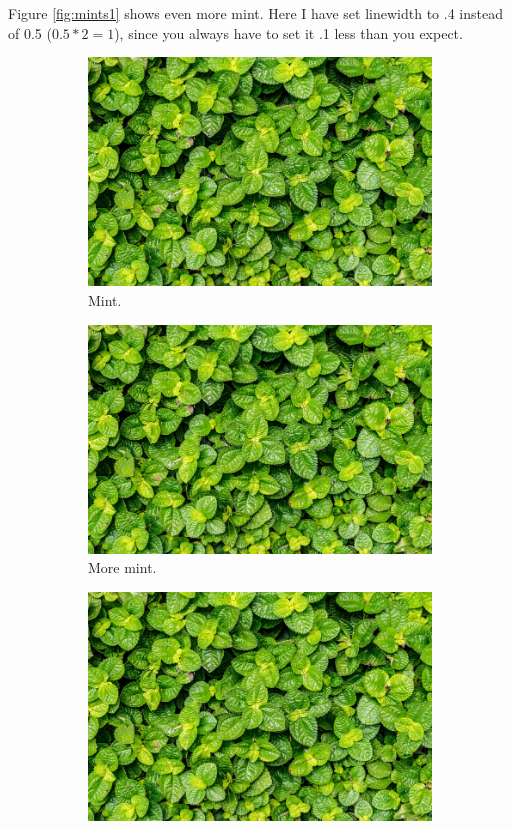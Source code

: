 \documentclass{book}
\begin{document}
Figure \ref{fig:mints1} shows even more mint. Here I have set linewidth to .4 instead of 0.5 ($0.5 * 2 = 1$), since you always have to set it .1 less than you expect.

\begin{figure}[h!]
  \centering
  \begin{subfigure}[b]{0.2\linewidth}
    \includegraphics[width=\linewidth]{mint.jpg}
     \caption{Mint.}
  \end{subfigure}
  \begin{subfigure}[b]{0.2\linewidth}
    \includegraphics[width=\linewidth]{mint.jpg}
    \caption{More mint.}
  \end{subfigure}
  \begin{subfigure}[b]{0.2\linewidth}
    \includegraphics[width=\linewidth]{mint.jpg}

\end{subfigure}
\end{figure}
\end{document}
